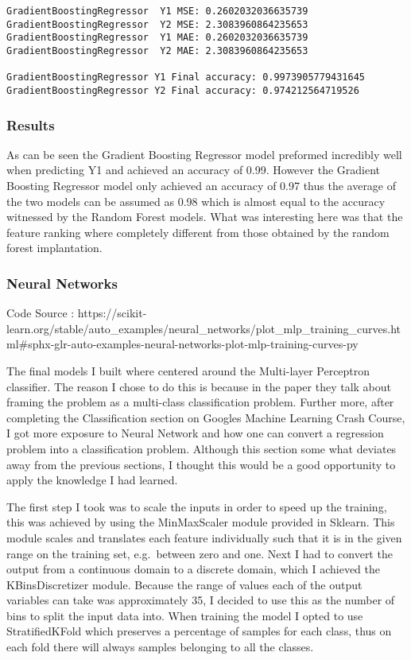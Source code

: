 \documentclass[11pt]{article}
\begin{document}
    \begin{Verbatim}[commandchars=\\\{\}]
GradientBoostingRegressor  Y1 MSE: 0.2602032036635739
GradientBoostingRegressor  Y2 MSE: 2.3083960864235653
GradientBoostingRegressor  Y1 MAE: 0.2602032036635739
GradientBoostingRegressor  Y2 MAE: 2.3083960864235653

GradientBoostingRegressor Y1 Final accuracy: 0.9973905779431645
GradientBoostingRegressor Y2 Final accuracy: 0.974212564719526

    \end{Verbatim}

    \hypertarget{results}{%
\subsubsection{Results}\label{results}}

As can be seen the Gradient Boosting Regressor model preformed
incredibly well when predicting Y1 and achieved an accuracy of 0.99.
However the Gradient Boosting Regressor model only achieved an accuracy
of 0.97 thus the average of the two models can be assumed as 0.98 which
is almost equal to the accuracy witnessed by the Random Forest models.
What was interesting here was that the feature ranking where completely
different from those obtained by the random forest implantation.

    \hypertarget{neural-networks}{%
\subsubsection{Neural Networks}\label{neural-networks}}

Code Source :
https://scikit-learn.org/stable/auto\_examples/neural\_networks/plot\_mlp\_training\_curves.html\#sphx-glr-auto-examples-neural-networks-plot-mlp-training-curves-py

The final models I built where centered around the Multi-layer
Perceptron classifier. The reason I chose to do this is because in the
paper they talk about framing the problem as a multi-class
classification problem. Further more, after completing the
Classification section on Googles Machine Learning Crash Course, I got
more exposure to Neural Network and how one can convert a regression
problem into a classification problem. Although this section some what
deviates away from the previous sections, I thought this would be a good
opportunity to apply the knowledge I had learned.

The first step I took was to scale the inputs in order to speed up the
training, this was achieved by using the MinMaxScaler module provided in
Sklearn. This module scales and translates each feature individually
such that it is in the given range on the training set, e.g.~between
zero and one. Next I had to convert the output from a continuous domain
to a discrete domain, which I achieved the KBinsDiscretizer module.
Because the range of values each of the output variables can take was
approximately 35, I decided to use this as the number of bins to split
the input data into. When training the model I opted to use
StratifiedKFold which preserves a percentage of samples for each class,
thus on each fold there will always samples belonging to all the
classes.
\end{document}
